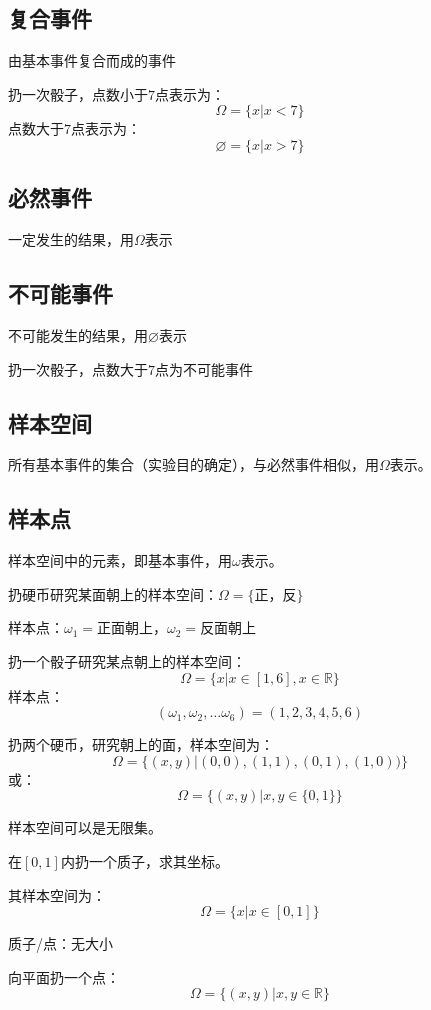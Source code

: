 \subsection{复合事件}%
\label{sub:复合事件}
由基本事件复合而成的事件
\begin{eg}
	扔一次骰子，点数小于$7$点表示为：
	$$
	\Omega=\{x|x<7\}
	$$
	点数大于$7$点表示为：
	$$
	\varnothing=\{x|x>7\}
	$$
\end{eg}
\subsection{必然事件}%
\label{sub:必然事件}
一定发生的结果，用$\Omega$表示
\subsection{不可能事件}%
\label{sub:不可能事件}
不可能发生的结果，用$\varnothing$表示
\begin{eg}
	扔一次骰子，点数大于$7$点为不可能事件
\end{eg}
\subsection{样本空间}%
\label{sub:样本空间}
所有基本事件的集合（实验目的确定），与必然事件相似，用$\Omega$表示。
\subsection{样本点}%
\label{sub:样本点}
样本空间中的元素，即基本事件，用$\omega$表示。
\begin{eg}
	扔硬币研究某面朝上的样本空间：$\Omega=\{\mbox{正，反}\}$

	样本点：$\omega_1=\mbox{正面朝上}$，$\omega_2=\mbox{反面朝上}$
\end{eg}
\begin{eg}
	扔一个骰子研究某点朝上的样本空间：
	$$
	\Omega=\{x|x\in[1,6],x\in\mathbb{R}\}
	$$
	样本点：
	$$
	(\omega_1,\omega_2,\dots\omega_6) = (1,2,3,4,5,6)
	$$
\end{eg}
\begin{eg}
	扔两个硬币，研究朝上的面，样本空间为：
	$$
		\Omega=\{(x,y)|(0,0),(1,1),(0,1),(1,0))\}
	$$
	或：
	$$
		\Omega=\{(x,y)|x,y\in\{0,1\}\}
	$$
\end{eg}
\begin{notation}
	样本空间可以是无限集。
\end{notation}
\begin{eg}
	在$[0,1]$内扔一个质子，求其坐标。

	其样本空间为：
	$$
    \Omega=\{x|x\in[0,1]\}
	$$
\end{eg}
\begin{notation}
    质子/点：无大小
\end{notation}
\begin{eg}
	向平面扔一个点：
	$$
		\Omega=\{(x,y)|x,y\in\mathbb{R}\}
	$$
\end{eg}

